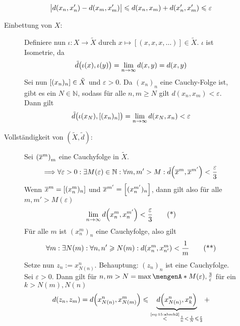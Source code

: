 \begin{description}
\begin{description}
	\[
		\abs[\big]{d(x_n,x_n') - d(x_m,x_m')} \le d(x_n, x_m) + d(x_n', x_m') \le \varepsilon
	\]
	\item[Einbettung von $X:$] Definiere nun $\iota : X \to \tilde{X}$ durch $x \mapsto [(x,x,x, \ldots )] \in \tilde{X}$. $\iota$ ist Isometrie, da
	\[
		\tilde{d} \enbrace[\big]{\iota(x),\iota(y)} = \lim_{ n \to \infty} d(x,y) = d(x,y)
	\]
	Sei nun $\benbrace*{(x_n)_n} \in \tilde{X}$ und $\varepsilon>0$. Da $(x_n)_n$ eine Cauchy-Folge ist, gibt es ein $N \in \mathds{N}$, sodass für alle
	$n,m \ge N$ gilt $d(x_n,x_m) <\varepsilon$. Dann gilt
	\[
		\tilde{d}\enbrace[\big]{\iota(x_N), \benbrace*{(x_n)_n} } = \lim_{ n \to \infty} d \enbrace*{x_N, x_n} < \varepsilon
	\]
	\item[Vollständigkeit von $(\tilde{X}, \tilde{d})$:] Sei $\enbrace*{\overline{x}^m}_m$ eine Cauchyfolge in $\tilde{X}$.
	\[
		\Longrightarrow \forall \varepsilon >0 : \exists M(\varepsilon) \in \mathds{N} : \forall m,m' > M : \tilde{d} \enbrace*{\overline{x}^m, \overline{x}^{m'}} < \frac{\varepsilon}{3} 
	\]
	Wenn $\overline{x}^m = \benbrace*{(x^m_n)_n}$ und $\overline{x}^{m'} = \benbrace*{(x^{m'}_n)_n} $, dann gilt also für alle $m,m' >M(\varepsilon)$
	\begin{equation*}
		\lim_{ n \to \infty} d \enbrace*{x^m_n, x^{m'}_n} < \frac{\varepsilon}{3}  \label{eq:15:absch1}\tag{*}
	\end{equation*}
	Für alle $m$ ist $(x^m_n)_n$ eine Cauchyfolge, also gilt
	\begin{equation*}
		\forall m : \exists N(m) : \forall n,n' \ge N(m) : d \enbrace*{x^m_n, x^m_{n'}} < \frac{1}{m}  \label{eq:15:absch2}\tag{**}
	\end{equation*}
	Setze nun $z_n := x^n_{N(n)}$. Behauptung: $(z_n)_n$ ist eine Cauchyfolge. Sei $\varepsilon>0$. Dann gilt für $n,m>N=\max\set{M(\varepsilon), \frac{3}{\varepsilon}}$
	für ein $k > N(m), N(n)$ 
	\begin{align*}
		d(z_n,z_m) = d \enbrace*{x^n_{N(n)}, x^m_{N(m)}} \le 
		\underbrace{d\enbrace*{x^n_{N(n)}, x^n_k}}_{\stackrel{\mbox{\tiny\eqref{eq:15:absch2}}}{<} \frac{1}{n} < \frac{1}{N} \le \frac{\varepsilon}{3}} + 

\end{align*}
\end{description}
\end{description}
